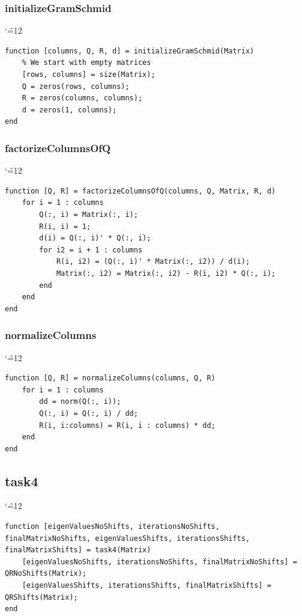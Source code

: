 \documentclass[12pt]{report}
\newenvironment{simplechar}{%
   \catcode`\^=12
}{}
\begin{document}
\subsubsection{initializeGramSchmid}
\begin{simplechar}
\begin{lstlisting}
function [columns, Q, R, d] = initializeGramSchmid(Matrix)
    % We start with empty matrices
    [rows, columns] = size(Matrix);
    Q = zeros(rows, columns);
    R = zeros(columns, columns);
    d = zeros(1, columns);
end
\end{lstlisting}
\end{simplechar}

\subsubsection{factorizeColumnsOfQ}
\begin{simplechar}
\begin{lstlisting}
function [Q, R] = factorizeColumnsOfQ(columns, Q, Matrix, R, d)
    for i = 1 : columns
        Q(:, i) = Matrix(:, i);
        R(i, i) = 1;
        d(i) = Q(:, i)' * Q(:, i);
        for i2 = i + 1 : columns
            R(i, i2) = (Q(:, i)' * Matrix(:, i2)) / d(i);
            Matrix(:, i2) = Matrix(:, i2) - R(i, i2) * Q(:, i);
        end
    end
end
\end{lstlisting}
\end{simplechar}

\subsubsection{normalizeColumns}
\begin{simplechar}
\begin{lstlisting}
function [Q, R] = normalizeColumns(columns, Q, R)
    for i = 1 : columns
        dd = norm(Q(:, i));
        Q(:, i) = Q(:, i) / dd;
        R(i, i:columns) = R(i, i : columns) * dd;
    end
end
\end{lstlisting}
\end{simplechar}

\subsection{task4}
\begin{simplechar}
\begin{lstlisting}
function [eigenValuesNoShifts, iterationsNoShifts, finalMatrixNoShifts, eigenValuesShifts, iterationsShifts, finalMatrixShifts] = task4(Matrix)
    [eigenValuesNoShifts, iterationsNoShifts, finalMatrixNoShifts] = QRNoShifts(Matrix);
    [eigenValuesShifts, iterationsShifts, finalMatrixShifts] = QRShifts(Matrix);
end
\end{lstlisting}
\end{simplechar}
\end{document}
